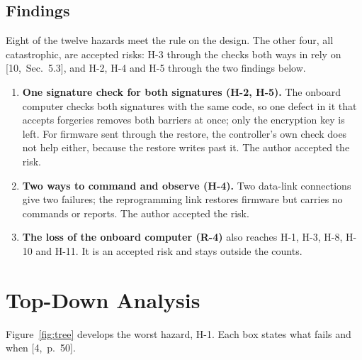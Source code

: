 \documentclass[11pt,a4paper]{article}
\renewcommand{\thesection}{\arabic{section}.0}
\begin{document}
\subsection{Findings}
Eight of the twelve hazards meet the rule on the design. The other four,
all catastrophic, are accepted risks: H-3 through the checks both ways in rely
on [10,~Sec.~5.3], and H-2, H-4 and H-5 through the two findings below.
\begin{enumerate}
\item \textbf{One signature check for both signatures (H-2, H-5).} The
  onboard computer checks both signatures with the same code, so one defect in
  it that accepts forgeries removes both barriers at once; only the encryption
  key is left. For firmware sent through the restore, the controller's own
  check does not help either, because the restore writes past it. The author
  accepted the risk.
\item \textbf{Two ways to command and observe (H-4).} Two data-link
  connections give two failures; the reprogramming link restores firmware but
  carries no commands or reports. The author accepted the risk.
\item \textbf{The loss of the onboard computer (R-4)} also reaches H-1, H-3,
  H-8, H-10 and H-11. It is an accepted risk and stays outside the counts.
\end{enumerate}

\appendix
\renewcommand{\thesection}{\Alph{section}}

\section{Top-Down Analysis}
Figure~\ref{fig:tree} develops the worst hazard, H-1. Each box states what
fails and when [4,~p.~50].
\end{document}
